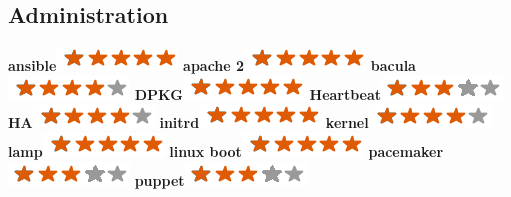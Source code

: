 \documentclass[]{friggeri-cv}
\begin{document}
\newpage
\begin{aside}
    \section{Administration}
        \textbf{ansible}\includegraphics[scale=0.40]{img/5stars.png}
        \textbf{apache 2}\includegraphics[scale=0.40]{img/5stars.png}
        \textbf{bacula}\includegraphics[scale=0.40]{img/4stars.png}
        \textbf{DPKG}\includegraphics[scale=0.40]{img/5stars.png}
        \textbf{Heartbeat}\includegraphics[scale=0.40]{img/3stars.png}
        \textbf{HA}\includegraphics[scale=0.40]{img/4stars.png}
        \textbf{initrd}\includegraphics[scale=0.40]{img/5stars.png}
        \textbf{kernel}\includegraphics[scale=0.40]{img/4stars.png}
        \textbf{lamp}\includegraphics[scale=0.40]{img/5stars.png}
        \textbf{linux boot}\includegraphics[scale=0.40]{img/5stars.png}
        \textbf{pacemaker}\includegraphics[scale=0.40]{img/3stars.png}
        \textbf{puppet}\includegraphics[scale=0.40]{img/3stars.png}

\end{aside}
\end{document}

